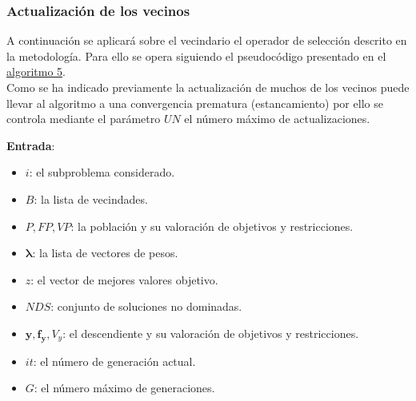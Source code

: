 \subsubsection{Actualización de los vecinos}

A continuación se aplicará sobre el vecindario el operador de selección descrito en la metodología. Para ello se opera siguiendo el pseudocódigo presentado en el \hyperref[alg:5]{algoritmo 5}.\\

Como se ha indicado previamente la actualización de muchos de los vecinos puede llevar al algoritmo a una convergencia prematura (estancamiento) por ello se controla mediante el parámetro $UN$ el número máximo de actualizaciones.\\

\begin{center}
\begin{minipage}[H]{0.8\linewidth}
    \begin{algorithm}[H]
\SetAlgoLined
 \textbf{Entrada}:
 \begin{itemize}
 
     \vspace{0.15cm} \item $i$: el subproblema considerado.
     \vspace{0.15cm} \item $B$: la lista de vecindades. 
     \vspace{0.15cm} \item $P, FP, VP$: la población y su valoración de objetivos y restricciones.
     \vspace{0.15cm} \item $\boldsymbol{\lambda}$: la lista de vectores de pesos.
     \vspace{0.15cm} \item $z$: el vector de mejores valores objetivo.
     \vspace{0.15cm} \item $NDS$: conjunto de soluciones no dominadas.
     \vspace{0.15cm} \item $\boldsymbol{y},\boldsymbol{f_y}, V_y$: el descendiente y su valoración de objetivos y restricciones.
     \vspace{0.15cm} \item $it$: el número de generación actual.
     \vspace{0.15cm} \item $G$: el número máximo de generaciones.
 \end{itemize}
 

\end{algorithm}
\end{minipage}
\end{center}
